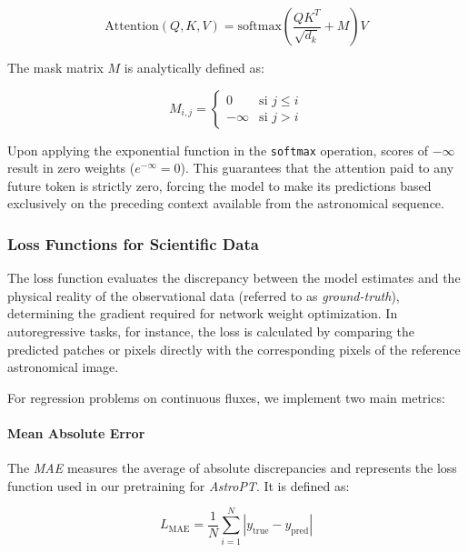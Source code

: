 \begin{equation}
\text{Attention}\left(Q, K, V\right) = \text{softmax}\left(\dfrac{Q K^T}{\sqrt{d_k}} + M\right) V
\label{eq:causal_attention}
\end{equation}

The mask matrix $M$ is analytically defined as:

\begin{equation}
M_{i,j} = \begin{cases} 0 & \text{si } j \le i \\ -\infty & \text{si } j > i \end{cases}
\label{eq:mask_matrix}
\end{equation}

Upon applying the exponential function in the \texttt{softmax} operation, scores of $-\infty$ result in zero weights ($e^{-\infty} = 0$). This guarantees that the attention paid to any future token is strictly zero, forcing the model to make its predictions based exclusively on the preceding context available from the astronomical sequence.

\subsubsection{Loss Functions for Scientific Data}

The loss function evaluates the discrepancy between the model estimates and the physical reality of the observational data (referred to as \textit{ground-truth}), determining the gradient required for network weight optimization. In autoregressive tasks, for instance, the loss is calculated by comparing the predicted patches or pixels directly with the corresponding pixels of the reference astronomical image.

For regression problems on continuous fluxes, we implement two main metrics:

\paragraph{Mean Absolute Error}

The \textit{\gls{MAE}} measures the average of absolute discrepancies and represents the loss function used in our pretraining for \textit{AstroPT}. It is defined as:

\begin{equation}
L_{\text{MAE}} = \dfrac{1}{N} \sum_{i=1}^{N} |y_{\text{true}} - y_{\text{pred}}|
\label{eq:mae_loss}
\end{equation}

